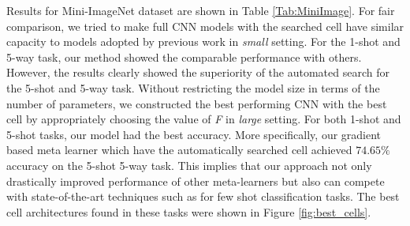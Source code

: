 \documentclass{article}
\begin{document}
Results for Mini-ImageNet dataset are shown in Table \ref{Tab:MiniImage}. For fair comparison, we tried to make full CNN models with the searched cell have similar capacity to models adopted by previous work in \textit{small} setting. For the 1-shot and 5-way task, our method showed the comparable performance with others. However, the results clearly showed the superiority of the automated search for the 5-shot and 5-way task. Without restricting the model size in terms of the number of parameters, we constructed the best performing CNN with the best cell by appropriately choosing the value of \textit{F} in \textit{large} setting. For both 1-shot and 5-shot tasks, our model had the best accuracy. More specifically, our gradient based meta learner which have the automatically searched cell achieved $74.65\%$ accuracy on the 5-shot 5-way task. This implies that our approach not only drastically improved performance of other meta-learners but also can compete with state-of-the-art techniques such as \cite{Rusu2018} for few shot classification tasks. The best cell architectures found in these tasks were shown in Figure \ref{fig:best_cells}.
\end{document}

